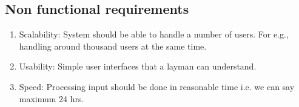 \begin{itemize}
\begin{enumerate}
\end{enumerate}
\vskip 0.5cm
\subsection{Non functional requirements}
\begin{enumerate} 
\item Scalability: System should be able to handle a number of users. 
For e.g., handling around thousand users at the same time.
\item Usability: Simple user interfaces that a layman can understand.
\item Speed: Processing input should be done in reasonable time
 i.e. we can say maximum 24 hrs.
\end{enumerate}
\end{itemize}



